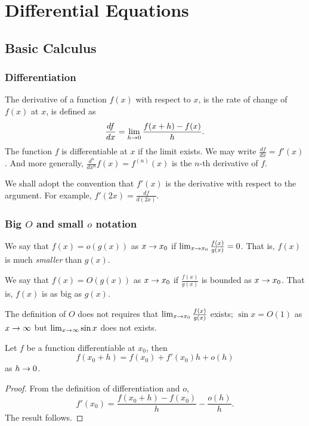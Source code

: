 \documentclass[main.tex]{subfiles}
\begin{document}
	\chapter{Differential Equations}
		\section{Basic Calculus}
			\subsection{Differentiation}
			\begin{definition}
					The derivative of a function $f(x)$ with respect to $x$, is the rate of change of $f(x)$ at $x$, is defined as
					\begin{equation}
						\frac{df}{dx} = \lim_{h \rightarrow 0} \frac{f(x + h) - f(x)}{h}.
					\end{equation}
					The function $f$ is differentiable at $x$ if the limit exists. We may write $\frac{df}{dx} = f'(x)$. And more generally, $\frac{d^n}{dx^n} f(x) = f^{(n)}(x)$ is the $n$-th derivative of $f$.
			\end{definition}
			We shall adopt the convention that $f'(x)$ is the derivative with respect to the argument. For example, $f'(2x) = \frac{df}{d(2x)}$.
			
			\subsection{Big $O$ and small $o$ notation}
				\begin{definition}
					We say that $f(x) = o(g(x))$ as $x \rightarrow x_0$ if $\lim_{x\rightarrow x_0} \frac{f(x)}{g(x)} = 0$. That is, $f(x)$ is much \textit{smaller} than $g(x)$.
				\end{definition}
				\begin{definition}
					We say that $f(x) = O(g(x))$ as $x \rightarrow x_0$ if $\frac{f(x)}{g(x)}$ is bounded as $x \rightarrow x_0$. That is, $f(x)$ is as big as $g(x)$.
				\end{definition}
				The definition of $O$ does not requires that $\lim_{x \rightarrow x_0}\frac{f(x)}{g(x)}$ exists; $\sin x = O(1)$ as $x \rightarrow \infty$ but $\lim_{x \rightarrow \infty} \sin x$ does not exists.
				
				\begin{theorem}
					Let $f$ be a function differentiable at $x_0$, then
					\begin{equation}
						f(x_0 + h) = f(x_0) + f'(x_0)h + o(h)
					\end{equation}
				as $h \rightarrow 0$.
				\end{theorem}
				\begin{proof}
					From the definition of differentiation and $o$,
					\begin{equation}
						f'(x_0) = \frac{f(x_0 + h) - f(x_0)}{h} - \frac{o(h)}{h}.
					\end{equation}
					The result follows.
				\end{proof}		
\end{document}
